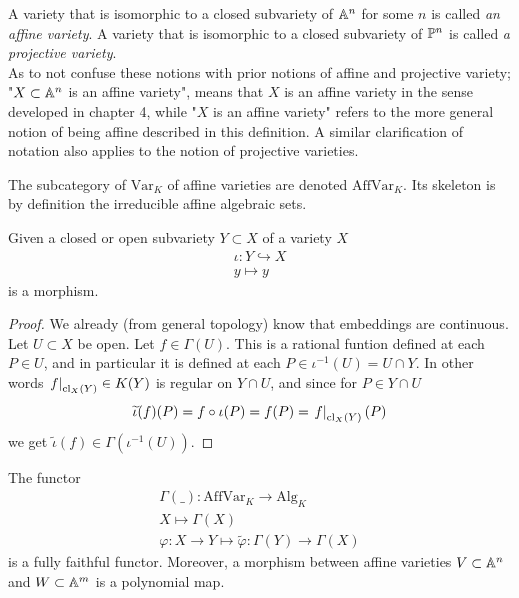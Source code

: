     \begin{definition}
        A variety that is isomorphic to a closed subvariety of $\mathbb{A}^n$ for some $n$ is called \textit{an affine variety}. A variety that is isomorphic to a closed subvariety of $\mathbb{P}^n$ is called \textit{a projective variety}.\\
        As to not confuse these notions with prior notions of affine and projective variety; "$X\subset \mathbb{A}^n$ is an affine variety", means that $X$ is an affine variety in the sense developed in chapter 4, while "$X$ is an affine variety" refers to the more general notion of being affine described in this definition. A similar clarification of notation also applies to the notion of projective varieties. 
    \end{definition}
    \begin{remark}
        The subcategory of $\mathrm{Var}_K$ of affine varieties are denoted $\mathrm{AffVar}_K$. Its skeleton is by definition the irreducible affine algebraic sets. 
    \end{remark}
    \begin{lemma}
        Given a closed or open subvariety $Y\subset X$ of a variety $X$
        \begin{gather*}
            \iota : Y\hookrightarrow X\\
            y\mapsto y
        \end{gather*}
        is a morphism.
    \end{lemma}
    \begin{proof}
         We already (from general topology) know that embeddings are continuous. Let $U\subset X$ be open.  Let $f\in \Gamma(U)$. This is a rational funtion defined at each $P\in U$, and in particular it is defined at each $P\in \iota^{-1}(U)=U\cap Y$. In other words $\left. f\right|_{\mathrm{cl}_X(Y)}\in K(Y)$ is regular on $Y\cap U$, and since for $P\in Y\cap U$
         $$
            \widetilde{\iota}(f)(P)=f\circ \iota(P)= f(P)=\left. f\right|_{\mathrm{cl}_X(Y)}(P)
         $$
         we get $\widetilde{\iota}(f)\in \Gamma(\iota^{-1}(U))$. 
    \end{proof}
    \begin{lemma}
        The functor 
        \begin{gather*}
            \Gamma(\_): \mathrm{AffVar}_K \rightarrow \mathrm{Alg}_K\\
            X\mapsto \Gamma(X)\\
            \varphi : X\rightarrow Y \mapsto \widetilde{\varphi}: \Gamma(Y)\rightarrow \Gamma(X)
        \end{gather*}
        is a fully faithful functor. Moreover, a morphism between affine varieties $V\subset \mathbb{A}^n$ and $W\subset \mathbb{A}^m$ is a polynomial map. 
    \end{lemma}
